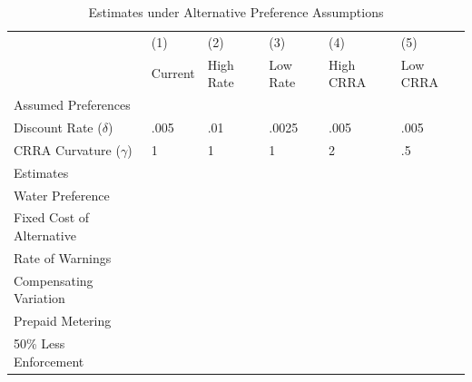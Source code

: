 \documentclass[12pt,table]{article}
\begin{document}
\begin{table}[H]
\centering
\caption{Estimates under Alternative Preference Assumptions}\label{table:robustestimates}
\begin{threeparttable}
\begin{tabular}{@{}l*{1}{FFFFF}@{}}
\toprule
& (1) & (2) & (3) & (4) & (5) \\
   & Current & High Rate & Low Rate & High CRRA &  Low CRRA \\[.2em]
\midrule   
Assumed Preferences\\
\hspace{1em}Discount Rate ($\delta$)  & .005  & .01 & .0025  & .005 & .005     \\
\hspace{1em}CRRA Curvature ($\gamma$)  & 1  & 1 & 1 & 2 & .5     \\[.5em]
Estimates \\
\hspace{1em}Water Preference  &  &  &  &  &  \\
\hspace{1em}Fixed Cost of Alternative  &    &    &    &    &    \\
\hspace{1em}Rate of Warnings  &   &   &   &   &   \\[.5em]
Compensating Variation \\
\hspace{1em}Prepaid Metering &   &   &   &   &     \\  
\hspace{1em}50\% Less Enforcement &  &  &  &  &     \\

\end{tabular}
\end{threeparttable}
\end{table}
\end{document}
